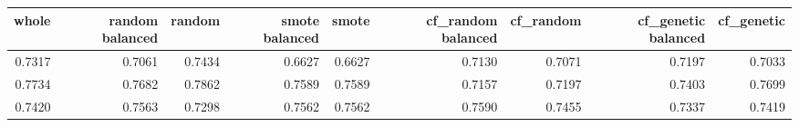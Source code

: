 \begin{tabular}{rrrrrrrrr}
\toprule

 whole &  random balanced &  random &  smote balanced &  smote &  cf\_random balanced &  cf\_random &  cf\_genetic balanced &  cf\_genetic \\
\midrule

0.7317 &           0.7061 &  0.7434 &          0.6627 & 0.6627 &              0.7130 &     0.7071 &               0.7197 &      0.7033 \\
0.7734 &           0.7682 &  0.7862 &          0.7589 & 0.7589 &              0.7157 &     0.7197 &               0.7403 &      0.7699 \\
0.7420 &           0.7563 &  0.7298 &          0.7562 & 0.7562 &              0.7590 &     0.7455 &               0.7337 &      0.7419 \\

\bottomrule
\end{tabular}
